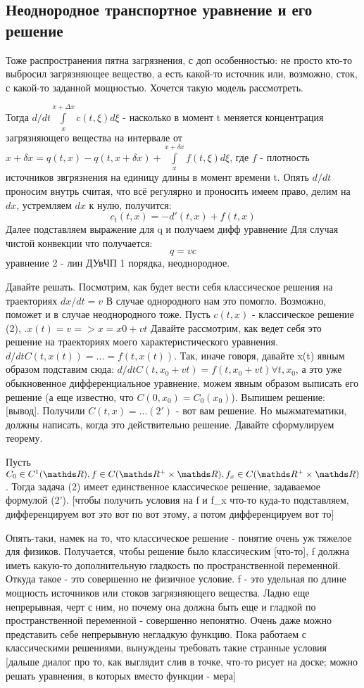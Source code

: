 \subsection{Неоднородное транспортное уравнение и его решение}

Тоже распространения пятна загрязнения, с доп особенностью: не просто кто-то выбросил загрязняющее вещество, а есть какой-то источник или, возможно, сток, с какой-то заданной мощностью. Хочется такую модель рассмотреть.

Тогда $d/dt \int \limits_x^{x + \Delta x} c(t, \xi ) d \xi$ - насколько в момент t меняется концентрация загрязняющего вещества на интервале от $x + \delta x = q(t, x) - q(t, x + \delta x) + \int \limits_x^{x+\delta x} f(t,\xi) d\xi$, где $f$ - плотность источников звгрязнения на единицу длины в момент времени t.
Опять $d/dt$ проносим внутрь считая, что всё регулярно и проносить имеем право, делим на $dx$, устремляем $dx$ к нулю, получится:
$$c_t(t,x) = -d'(t,x) + f(t, x)$$
Далее подставляем выражение для q и получаем дифф уравнение
Для случая чистой конвекции что получается:
$$q = vc$$
уравнение 2 - лин ДУвЧП 1 порядка, неоднородное.

Давайте решать. Посмотрим, как будет вести себя классическое решения на траекториях $dx/dt = v$
В случае однородного нам это помогло. Возможно, поможет и в случае неоднородного тоже.
Пусть $c(t,x)$ - классическое решение (2), .$x(t) = v => x = x0 + vt$
Давайте рассмотрим, как ведет себя это решение на траекториях моего характеристического уравнения. $d/dt C(t, x(t)) = ... = f (t, x(t))$. Так, иначе говоря, давайте x(t) явным образом подставим сюда: $d/dt C(t, x_0 + vt) = f(t, x_0 + vt) \forall t, x_0$, а это уже обыкновенное дифференциальное уравнение, можем явным образом выписать его решение (а еще известно, что $C(0, x_0) = C_0(x_0)$). Выпишем решение: [вывод]. Получили $C(t, x) = ... (2')$ - вот вам решение. Но мыжматематики, должны написать, когда это действительно решение. Давайте сформулируем теорему.

\begin{theorem}
Пусть $C_0 \in C^1(\real), f \in C(\real^+ \times \real), f_x \in C(\real^+ \times \real)$. Тогда задача (2) имеет единственное классическое решение, задаваемое формулой (2'). [чтобы получить условия на f и f_x что-то куда-то подставляем, дифференцируем вот это вот по вот этому, а потом дифференцируем вот то]
\end{theorem}

Опять-таки, намек на то, что классическое решение - понятие очень уж тяжелое для физиков. Получается, чтобы решение было классическим [что-то], f должна иметь какую-то дополнительную гладкость по пространственной переменной. Откуда такое - это совершенно не физичное условие. f - это удельная по длине мощность источников или стоков загрязняющего вещества. Ладно еще непрерывная, черт с ним, но почему она должна быть еще и гладкой по пространственной переменной - совершенно непонятно. Очень даже можно представить себе непрерывную негладкую функцию. Пока работаем с классическими решениями, вынуждены требовать такие странные условия [дальше диалог про то, как выглядит слив в точке, что-то рисует на доске; можно решать уравнения, в которых вместо функции - мера]